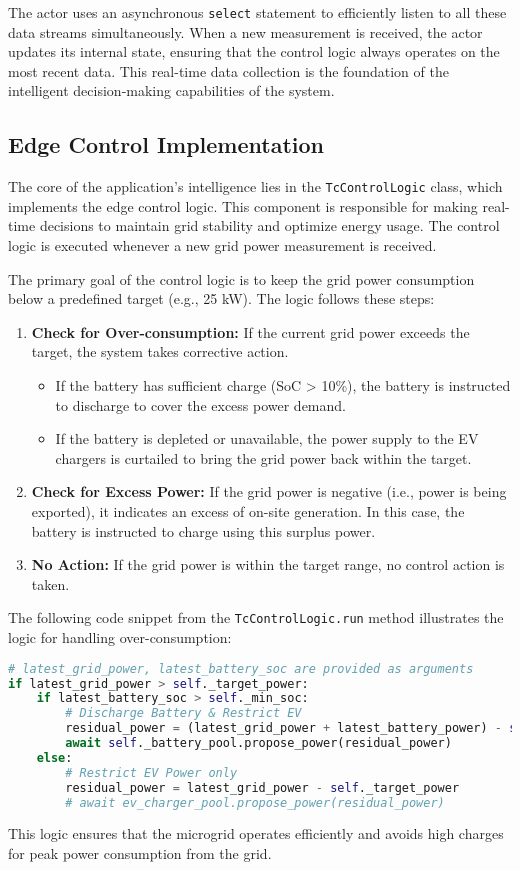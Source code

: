 \documentclass{article}
\begin{document}
The actor uses an asynchronous \texttt{select} statement to efficiently listen to all these data streams simultaneously. When a new measurement is received, the actor updates its internal state, ensuring that the control logic always operates on the most recent data. This real-time data collection is the foundation of the intelligent decision-making capabilities of the system.

\subsection{Edge Control Implementation}
The core of the application's intelligence lies in the \texttt{TcControlLogic} class, which implements the edge control logic. This component is responsible for making real-time decisions to maintain grid stability and optimize energy usage. The control logic is executed whenever a new grid power measurement is received.

The primary goal of the control logic is to keep the grid power consumption below a predefined target (e.g., 25 kW). The logic follows these steps:
\begin{enumerate}
    \item \textbf{Check for Over-consumption:} If the current grid power exceeds the target, the system takes corrective action.
    \begin{itemize}
        \item If the battery has sufficient charge (SoC > 10\%), the battery is instructed to discharge to cover the excess power demand.
        \item If the battery is depleted or unavailable, the power supply to the EV chargers is curtailed to bring the grid power back within the target.
    \end{itemize}
    \item \textbf{Check for Excess Power:} If the grid power is negative (i.e., power is being exported), it indicates an excess of on-site generation. In this case, the battery is instructed to charge using this surplus power.
    \item \textbf{No Action:} If the grid power is within the target range, no control action is taken.
\end{enumerate}

The following code snippet from the \texttt{TcControlLogic.run} method illustrates the logic for handling over-consumption:
\begin{lstlisting}[language=Python, caption={Control logic for handling grid power over-consumption.}]
# latest_grid_power, latest_battery_soc are provided as arguments
if latest_grid_power > self._target_power:
    if latest_battery_soc > self._min_soc:
        # Discharge Battery & Restrict EV
        residual_power = (latest_grid_power + latest_battery_power) - self._target_power
        await self._battery_pool.propose_power(residual_power)
    else:
        # Restrict EV Power only
        residual_power = latest_grid_power - self._target_power
        # await ev_charger_pool.propose_power(residual_power)
\end{lstlisting}
This logic ensures that the microgrid operates efficiently and avoids high charges for peak power consumption from the grid.
\end{document}
